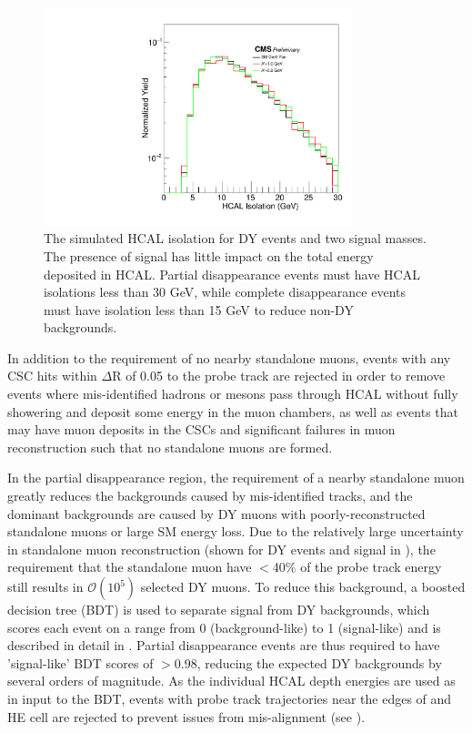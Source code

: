 \begin{figure}[htpb]
	\centering
	\includegraphics[width=0.8\textwidth]{figures/allEventshcalIso0p3_stack.pdf}
	\caption[HCAL Isolation]{The simulated HCAL isolation for DY events and two signal masses. The presence of signal has little impact on the total energy deposited in HCAL. Partial disappearance events must have HCAL isolations less than 30 GeV, while complete disappearance events must have isolation less than 15 GeV to reduce non-DY backgrounds.}
	\label{fig:hcalIso}
\end{figure}

In addition to the requirement of no nearby standalone muons, events with any CSC hits within $\Delta$R of 0.05 to the probe track are rejected in order to remove events where mis-identified hadrons or mesons pass through HCAL without fully showering and deposit some energy in the muon chambers, as well as events that may have muon deposits in the CSCs and significant failures in muon reconstruction such that no standalone muons are formed.

In the partial disappearance region, the requirement of a nearby standalone muon greatly reduces the backgrounds caused by mis-identified tracks, and the dominant backgrounds are caused by DY muons with poorly-reconstructed standalone muons or large SM energy loss.
Due to the relatively large uncertainty in standalone muon reconstruction (shown for DY events and signal in ), the requirement that the standalone muon have $<$40$\%$ of the probe track energy still results in $\mathcal{O}(10^{5})$ selected DY muons.
To reduce this background, a boosted decision tree (BDT) is used to separate signal from DY backgrounds, which scores each event on a range from 0 (background-like) to 1 (signal-like) and is described in detail in .
Partial disappearance events are thus required to have 'signal-like' BDT scores of $>$0.98, reducing the expected DY backgrounds by several orders of magnitude.
As the individual HCAL depth energies are used as in input to the BDT, events with probe track trajectories near the edges of and HE cell are rejected to prevent issues from mis-alignment (see ).

